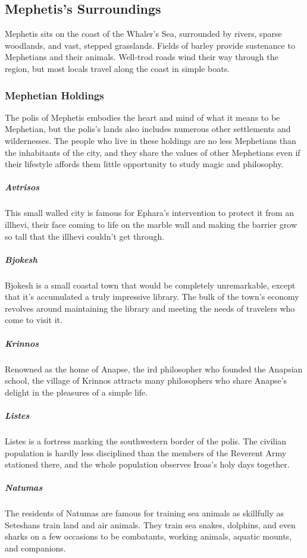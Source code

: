 \subsection*{Mephetis's Surroundings}
    Mephetis sits on the coast of the Whaler's Sea, surrounded by rivers, sparse woodlands, and vast, stepped grasslands.
    Fields of barley provide sustenance to Mephetians and their animals.
    Well-trod roads wind their way through the region, but most locals travel along the coast in simple boats.

    \subsubsection{Mephetian Holdings}
        The polis of Mephetis embodies the heart and mind of what it means to be Mephetian, but the polis's lands also includes numerous other settlements and wildernesses.
        The people who live in these holdings are no less Mephetians than the inhabitants of the city, and they share the values of other Mephetians even if their lifestyle affords them little opportunity to study magic and philosophy.

        \subparagraph{Avtrisos} This small walled city is famous for Ephara's intervention to protect it from an illhevi, their face coming to life on the marble wall and making the barrier grow so tall that the illhevi couldn't get through.

        \newpage

        \subparagraph{Bjokesh} Bjokesh is a small coastal town that would be completely unremarkable, except that it's accumulated a truly impressive library.
        The bulk of the town's economy revolves around maintaining the library and meeting the needs of travelers who come to visit it.

        \subparagraph{Krinnos} Renowned as the home of Anapse, the ird philosopher who founded the Anapsian school, the village of Krinnos attracts many philosophers who share Anapse's delight in the pleasures of a simple life.

        \subparagraph{Listes} Listes is a fortress marking the southwestern border of the polis.
        The civilian population is hardly less disciplined than the members of the Reverent Army stationed there, and the whole population observes Iroas's holy days together.

        \subparagraph{Natumas} The residents of Natumas are famous for training sea animals as skillfully as Seteshans train land and air animals.
        They train sea snakes, dolphins, and even sharks on a few occasions to be combatants, working animals, aquatic mounts, and companions.


